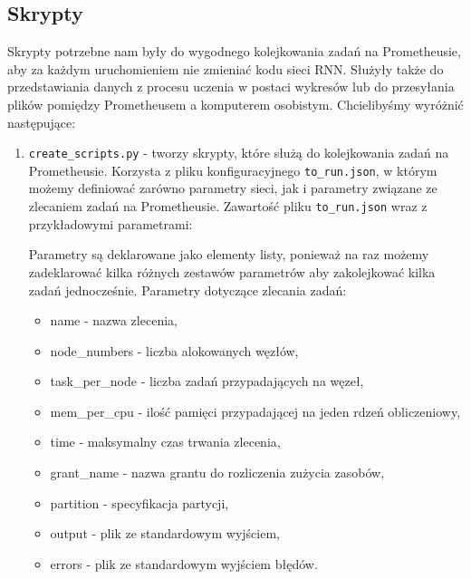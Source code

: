 \subsection{Skrypty}
Skrypty potrzebne nam były do wygodnego kolejkowania zadań na Prometheusie, aby za
każdym uruchomieniem nie zmieniać kodu sieci RNN. Służyły także do przedstawiania danych z procesu uczenia w postaci wykresów
lub do przesyłania plików pomiędzy Prometheusem a komputerem osobistym. Chcielibyśmy wyróżnić następujące:
\begin{enumerate}
	\item {\texttt{create\_scripts.py} } -
	tworzy skrypty, które służą do kolejkowania zadań na Prometheusie. Korzysta z pliku konfiguracyjnego \texttt{to\_run.json},
	w którym możemy definiować zarówno parametry sieci, jak i parametry związane ze zlecaniem zadań na Prometheusie.
	Zawartość pliku \texttt{to\_run.json} wraz z przykładowymi parametrami:

	\begin{import}
		[
		  {
		    "beginning": "#!/bin/sh",
		    "name": "#SBATCH -J test",
		    "node_numbers": "#SBATCH -N 1",
		    "tasks_per_node": "#SBATCH --ntasks-per-node=1",
		    "mem_per_cpu": "#SBATCH --mem-per-cpu=5GB",
		    "time": "#SBATCH --time=00:20:00",
		    "grant_name": "#SBATCH -A ap2018",
		    "partition": "#SBATCH -p plgrid",
		    "output": "#SBATCH --output=",
		    "errors": "#SBATCH --error=",
		    "hidden_size": "100",
		    "num_layers": "2",
		    "num_epochs": "5",
		    "batch_size": "40",
		    "timesteps": "50",
		    "learning_rate": "0.004",
		    "authors_size": "100",
		    "vocab_size": "48",
		    "save_path": "../results/",
		    "learning_tensors_path": "../data/dutch/tensors/known/",
		    "testing_tensors_path": "../data/dutch/tensors/known/",
		    "language": "DU"
		  }
		]
	\end{import}
	Parametry są deklarowane jako elementy listy, ponieważ na raz możemy zadeklarować kilka różnych zestawów
	parametrów aby zakolejkować kilka zadań jednocześnie.
	Parametry dotyczące zlecania zadań:
	\begin{itemize}
	  \item name - nazwa zlecenia,
	  \item node\_numbers - liczba alokowanych węzłów,
	  \item task\_per\_node - liczba zadań przypadających na węzeł,
	  \item mem\_per\_cpu - ilość pamięci przypadającej na jeden rdzeń obliczeniowy,
	  \item time - maksymalny czas trwania zlecenia,
	  \item grant\_name - nazwa grantu do rozliczenia zużycia zasobów,
	  \item partition - specyfikacja partycji,
	  \item output - plik ze standardowym wyjściem,
	  \item errors - plik ze standardowym wyjściem błędów.
	\end{itemize}


\end{enumerate}
